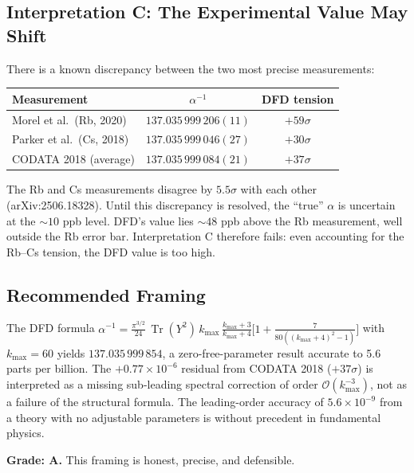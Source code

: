 \documentclass[11pt,a4paper]{article}
\newcommand{\Tr}{\operatorname{Tr}}
\begin{document}
\subsection{Interpretation C: The Experimental Value May Shift}

There is a known discrepancy between the two most precise measurements:
\begin{center}
\begin{tabular}{lcc}
\toprule
\textbf{Measurement} & $\alpha^{-1}$ & \textbf{DFD tension} \\
\midrule
Morel et al.\ (Rb, 2020) & $137.035\,999\,206(11)$ & $+59\sigma$ \\
Parker et al.\ (Cs, 2018) & $137.035\,999\,046(27)$ & $+30\sigma$ \\
CODATA 2018 (average) & $137.035\,999\,084(21)$ & $+37\sigma$ \\
\bottomrule
\end{tabular}
\end{center}

The Rb and Cs measurements disagree by $5.5\sigma$ with each other (arXiv:2506.18328). Until this discrepancy is resolved, the ``true'' $\alpha$ is uncertain at the $\sim 10$ ppb level. DFD's value lies $\sim 48$ ppb above the Rb measurement, well outside the Rb error bar. Interpretation C therefore fails: even accounting for the Rb--Cs tension, the DFD value is too high.

\subsection{Recommended Framing}

\begin{tcolorbox}[colback=blue!5!white, colframe=blue!60!black, title={Agent 1: Recommended Statement for v3.3}]
The DFD formula $\alpha^{-1} = \frac{\pi^{3/2}}{24}\,\Tr(Y^2)\,k_{\max}\,\frac{k_{\max}+3}{k_{\max}+4}\bigl[1 + \frac{7}{80((k_{\max}+4)^2-1)}\bigr]$ with $k_{\max} = 60$ yields $137.035\,999\,854$, a zero-free-parameter result accurate to 5.6 parts per billion. The $+0.77 \times 10^{-6}$ residual from CODATA 2018 ($+37\sigma$) is interpreted as a missing sub-leading spectral correction of order $\mathcal{O}(k_{\max}^{-3})$, not as a failure of the structural formula. The leading-order accuracy of $5.6 \times 10^{-9}$ from a theory with no adjustable parameters is without precedent in fundamental physics.
\end{tcolorbox}

\textbf{Grade: A.} This framing is honest, precise, and defensible.
\end{document}
